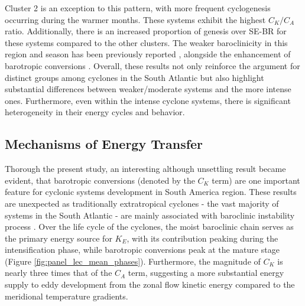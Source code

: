 \documentclass[pdflatex,sn-chicago]{sn-jnl}%
\theoremstyle{plain}
\theoremstyle{definition}
\theoremstyle{remark}
\theoremstyle{definition}
\begin{document}
Cluster 2 is an exception to this pattern, with more frequent cyclogenesis occurring during the warmer months. These systems exhibit the highest \( C_K/C_A \) ratio. Additionally, there is an increased proportion of genesis over SE-BR for these systems compared to the other clusters. The weaker baroclinicity in this region and season has been previously reported \citep{gramcianinov2019properties,crespo2021potential}, alongside the enhancement of barotropic conversions \citet{dias2011energy}. Overall, these results not only reinforce the argument for distinct groups among cyclones in the South Atlantic but also highlight substantial differences between weaker/moderate systems and the more intense ones. Furthermore, even within the intense cyclone systems, there is significant heterogeneity in their energy cycles and behavior.

\subsection{Mechanisms of Energy Transfer}

Thorough the present study, an interesting although unsettling result became evident, that barotropic conversions (denoted by the $C_K$ term) are one important feature for cyclonic systems development in South America region. These results are unexpected as traditionally extratropical cyclones - the vast majority of systems in the South Atlantic \citep{marrafon2022classificaccao} - are mainly associated with baroclinic instability process \citep{bjerknes1922life,charney1964growth,hoskins1990existence}. Over the life cycle of the cyclones, the moist baroclinic chain serves as the primary energy source for \( K_E \), with its contribution peaking during the intensification phase, while barotropic conversions peak at the mature stage (Figure \ref{fig:panel_lec_mean_phases}). Furthermore, the magnitude of \( C_K \) is nearly three times that of the \( C_A \) term, suggesting a more substantial energy supply to eddy development from the zonal flow kinetic energy compared to the meridional temperature gradients.
\end{document}
